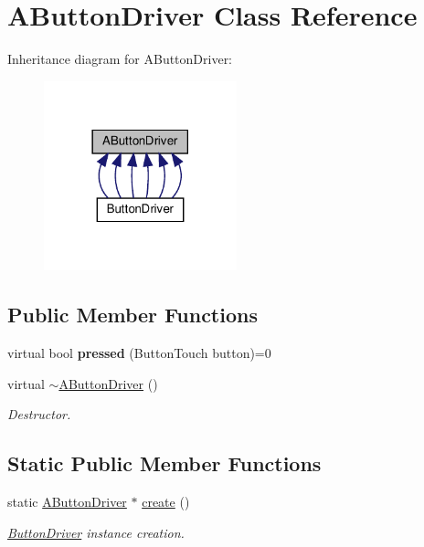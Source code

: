 \hypertarget{classAButtonDriver}{}\section{A\+Button\+Driver Class Reference}
\label{classAButtonDriver}


Inheritance diagram for A\+Button\+Driver\+:
\nopagebreak
\begin{figure}[H]
\begin{center}
\leavevmode
\includegraphics[width=158pt]{classAButtonDriver__inherit__graph}
\end{center}
\end{figure}
\subsection*{Public Member Functions}
\begin{DoxyCompactItemize}
\item 
\mbox{\label{classAButtonDriver_a76900724cd51ab5213273cd2ef4e4918}} 
virtual bool {\bfseries pressed} (Button\+Touch button)=0
\item 
\mbox{\label{classAButtonDriver_aa234368ae4f01fd3bd0d63b605f85ef8}} 
virtual \hyperlink{classAButtonDriver_aa234368ae4f01fd3bd0d63b605f85ef8}{$\sim$\+A\+Button\+Driver} ()
\begin{DoxyCompactList}\small\item\em Destructor. \end{DoxyCompactList}\end{DoxyCompactItemize}
\subsection*{Static Public Member Functions}
\begin{DoxyCompactItemize}
\item 
\mbox{\label{classAButtonDriver_abc99f5a63facaaa7c57b39eca57e3c8b}} 
static \hyperlink{classAButtonDriver}{A\+Button\+Driver} $\ast$ \hyperlink{classAButtonDriver_abc99f5a63facaaa7c57b39eca57e3c8b}{create} ()
\begin{DoxyCompactList}\small\item\em \hyperlink{classButtonDriver}{Button\+Driver} instance creation. \end{DoxyCompactList}\end{DoxyCompactItemize}
